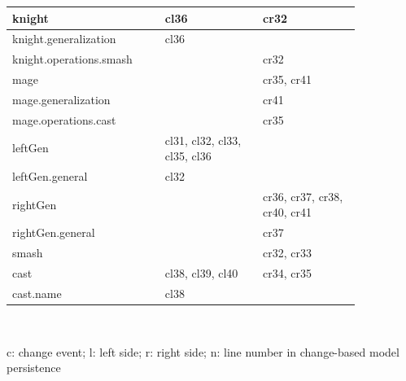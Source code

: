 \begin{table}[ht]
\begin{sffamily}
\begin{tabular}{|m{0.36\linewidth}|m{0.245\linewidth}|m{0.245\linewidth}|}
        knight                             & cl36                                      & cr32                                       \\ \hline
        knight.generalization              & cl36                                      &                                            \\ \hline
        knight.operations.smash            &                                           & cr32                                       \\ \hline
        mage                               &                                           & cr35, cr41                                 \\ \hline
        mage.generalization                &                                           & cr41                                       \\ \hline
        mage.operations.cast               &                                           & cr35                                       \\ \hline
        leftGen                            & cl31, cl32, cl33, cl35, cl36              &                                            \\ \hline
        leftGen.general                    & cl32                                      &                                            \\ \hline
        rightGen                           &                                           & cr36, cr37, cr38, cr40, cr41               \\ \hline
        rightGen.general                   &                                           & cr37                                       \\ \hline
        smash                              &                                           & cr32, cr33                                 \\ \hline
        cast                               & cl38, cl39, cl40                          & cr34, cr35                                 \\ \hline
        cast.name                          & cl38                                      &                                            \\ \hline
      \end{tabular}\\
    \end{sffamily}
    c: change event; l: left side; r: right side; n: line number in change-based model persistence
\end{table}

